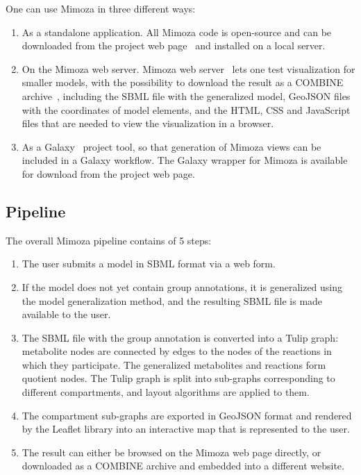 \documentclass{bmcart}
\begin{document}
One can use Mimoza in three different ways:
\begin{enumerate}
\item As a standalone application.
All Mimoza code is open-source and can be downloaded from the project web page~\cite{Zhukovaa} and installed on a local server.
\item On the Mimoza web server.
Mimoza web server~\cite{Zhukovaa} lets one test visualization for smaller models, with the possibility to download the result as a COMBINE archive~\cite{Bergmann2014}, including the SBML file with the generalized model, GeoJSON files with the coordinates of model elements, and the HTML, CSS and JavaScript files that are needed to view the visualization in a browser.
\item As a Galaxy~\cite{Blankenberg2010} project tool, so that generation of Mimoza views can be included in a Galaxy workflow.
The Galaxy wrapper for Mimoza is available for download from the project web page.
\end{enumerate}

 
\subsection*{Pipeline}
The overall Mimoza pipeline  contains of 5 steps:
\begin{enumerate}
\item The user submits a model in SBML format via a web form.
\item If the model does not yet contain group annotations, it is generalized using the model generalization method, and the resulting SBML file is made available to the user.
\item The SBML file with the group annotation is converted into a Tulip graph: metabolite nodes are connected by edges to the nodes of the reactions in which they participate. The generalized metabolites and reactions form quotient nodes. The Tulip graph is split into sub-graphs corresponding to different compartments, and layout algorithms are applied to them.
\item The compartment sub-graphs are exported in GeoJSON format and rendered by the Leaflet library into an interactive map that is represented to the user.
\item The result can either be browsed on the Mimoza web page directly, or downloaded as a COMBINE archive and embedded into a different website.
\end{enumerate}
\end{document}
